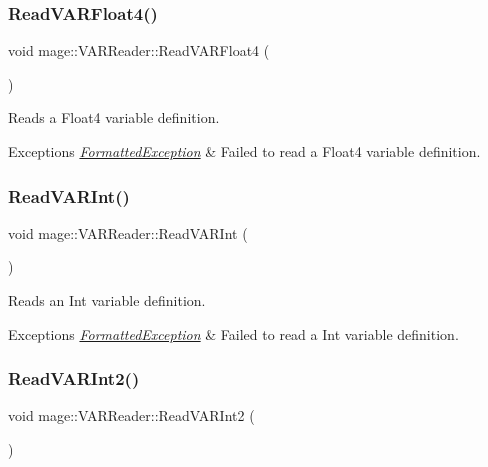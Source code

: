 \subsubsection{\texorpdfstring{Read\+V\+A\+R\+Float4()}{ReadVARFloat4()}}
{\footnotesize\ttfamily void mage\+::\+V\+A\+R\+Reader\+::\+Read\+V\+A\+R\+Float4 (\begin{DoxyParamCaption}{ }\end{DoxyParamCaption})\hspace{0.3cm}{\ttfamily [private]}}

Reads a Float4 variable definition.


\begin{DoxyExceptions}{Exceptions}
{\em \hyperlink{classmage_1_1_formatted_exception}{Formatted\+Exception}} & Failed to read a Float4 variable definition. \\
\hline
\end{DoxyExceptions}
\hypertarget{classmage_1_1_v_a_r_reader_a9b78c642785ef8a9c487ba9cc84842c4}{}\label{classmage_1_1_v_a_r_reader_a9b78c642785ef8a9c487ba9cc84842c4} 
\subsubsection{\texorpdfstring{Read\+V\+A\+R\+Int()}{ReadVARInt()}}
{\footnotesize\ttfamily void mage\+::\+V\+A\+R\+Reader\+::\+Read\+V\+A\+R\+Int (\begin{DoxyParamCaption}{ }\end{DoxyParamCaption})\hspace{0.3cm}{\ttfamily [private]}}

Reads an Int variable definition.


\begin{DoxyExceptions}{Exceptions}
{\em \hyperlink{classmage_1_1_formatted_exception}{Formatted\+Exception}} & Failed to read a Int variable definition. \\
\hline
\end{DoxyExceptions}
\hypertarget{classmage_1_1_v_a_r_reader_a33bc794769330f6d4593dfbfceaa0c95}{}\label{classmage_1_1_v_a_r_reader_a33bc794769330f6d4593dfbfceaa0c95} 
\subsubsection{\texorpdfstring{Read\+V\+A\+R\+Int2()}{ReadVARInt2()}}
{\footnotesize\ttfamily void mage\+::\+V\+A\+R\+Reader\+::\+Read\+V\+A\+R\+Int2 (\begin{DoxyParamCaption}{ }\end{DoxyParamCaption})\hspace{0.3cm}{\ttfamily [private]}}

